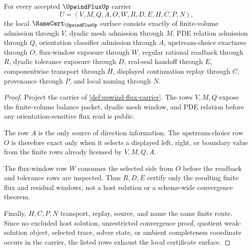 \begin{theorem}
\label{thm:upwind-flux-namecert-obligations}
For every accepted $\UpwindFluxUp$ carrier
$$
U=(V,M,Q,A,O,W,R,D,E,H,C,P,N),
$$
the local $\NameCert_{\UpwindFluxUp}$ surface consists exactly of finite-volume admission through $V$, dyadic mesh admission through $M$, PDE relation admission through $Q$, orientation classifier admission through $A$, upstream-choice exactness through $O$, flux-window exposure through $W$, regular rational readback through $R$, dyadic tolerance exposure through $D$, real-seal handoff through $E$, componentwise transport through $H$, displayed continuation replay through $C$, provenance through $P$, and local naming through $N$.
\end{theorem}
\begin{proof}
Project the carrier of \autoref{def:upwind-flux-carrier}. The rows $V,M,Q$ expose the finite-volume balance packet, dyadic mesh window, and PDE relation before any orientation-sensitive flux read is public.

The row $A$ is the only source of direction information. The upstream-choice row $O$ is therefore exact only when it selects a displayed left, right, or boundary value from the finite rows already licensed by $V,M,Q,A$.

The flux-window row $W$ consumes the selected side from $O$ before the readback and tolerance rows are inspected. Thus $R,D,E$ certify only the resulting finite flux and residual windows, not a host solution or a scheme-wide convergence theorem.

Finally, $H,C,P,N$ transport, replay, source, and name the same finite route. Since no excluded host solution, unrestricted convergence proof, quotient weak-solution object, selected trace, solver state, or ambient completeness coordinate occurs in the carrier, the listed rows exhaust the local certificate surface.
\end{proof}

